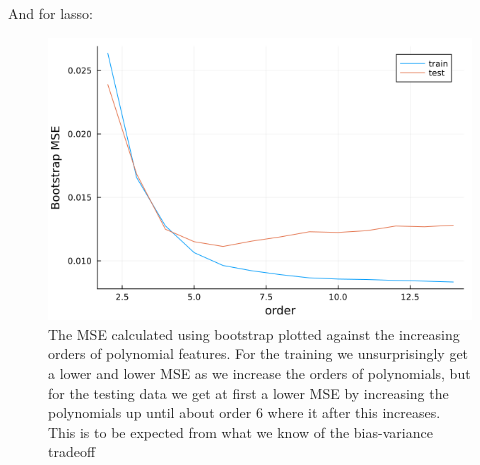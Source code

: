 \documentclass{article}
\begin{document}
And for lasso:
\begin{table}[htpb!]
\end{table}

\begin{figure}
    \includegraphics[scale=0.5]{bootstrapbiasvariance}
    \caption{The MSE calculated using bootstrap plotted against the increasing
        orders of polynomial features. For the training we unsurprisingly get a
        lower and lower MSE as we increase the orders of polynomials, but for the
        testing data we get at first a lower MSE by increasing the polynomials up
        until about order $6$ where it after this increases. This is to be expected
        from what we know of the bias-variance tradeoff}
    \label{bootstrap-bias-var}
\end{figure}
\end{document}
